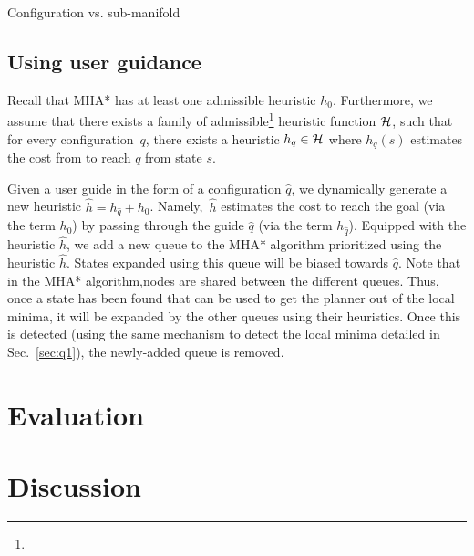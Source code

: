 \documentclass[conference]{IEEEtran}
\begin{document}
Configuration vs. sub-manifold


\subsection{Using user guidance}
Recall that MHA* has at least one admissible heuristic $h_{0}$.
Furthermore, we assume that there exists a family of admissible\footnote{} heuristic function $\mathcal{H}$, such that for every configuration~$q$, there exists a heuristic $h_q \in \mathcal{H}$ where $h_q(s)$ estimates the cost from to reach $q$ from state $s$.

Given a user guide in the form of a configuration $\hat{q}$, we dynamically generate a new heuristic $\hat{h} = h_{\hat{q}} + h_0$.
Namely,~$\hat{h}$ estimates the 
cost to reach the goal (via the term $h_0$) by passing through the guide $\hat{q}$ (via the term $h_{\hat{q}}$).
Equipped with the heuristic $\hat{h}$, we add a new queue to the MHA* algorithm prioritized using the heuristic $\hat{h}$. 
States expanded using this queue will be biased towards $\hat{q}$.
Note that in the MHA* algorithm,nodes are shared between the different queues.
Thus, once a state has been found that can be used to get the planner out of the local minima, it will be expanded by the other queues using their heuristics.
Once this is detected (using the same mechanism to detect the local minima detailed in Sec.~\ref{sec:q1}), the newly-added queue is removed.

\section{Evaluation}\label{sec:evaluation}

\section{Discussion}\label{sec:discussion}


%


\end{document}
